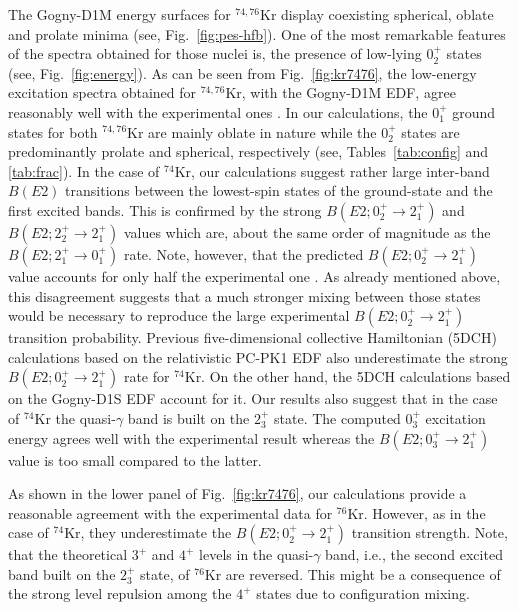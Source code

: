 \documentclass[twocolumn,showpacs,amsmath,amssymb,superscriptaddress]{revtex4-1}
\begin{document}
The Gogny-D1M  energy surfaces  for  $^{74,76}$Kr 
display coexisting spherical, oblate and prolate minima
(see, Fig.~\ref{fig:pes-hfb}). One of the most remarkable 
features of the spectra obtained for those nuclei is, the 
presence of  low-lying $0^+_2$ states
(see, Fig.~\ref{fig:energy}).  As can be seen from 
Fig.~\ref{fig:kr7476}, the low-energy excitation spectra
obtained for  $^{74,76}$Kr, with the Gogny-D1M 
EDF, agree reasonably well with the experimental ones \cite{clement2007}.
In our calculations, the  $0^+_1$ ground states for
both $^{74,76}$Kr  are mainly oblate in nature
while the $0^+_2$ states  are predominantly
prolate and spherical, respectively (see, Tables~\ref{tab:config} and \ref{tab:frac}).
In the case of $^{74}$Kr, our calculations suggest rather large inter-band $B(E2)$
transitions between the lowest-spin states of the ground-state and the
first excited bands. This is confirmed by the  strong  
$B(E2; 0^+_2\rightarrow 2^+_1)$ and $B(E2; 2^+_2\rightarrow 2^+_1)$
values which are, about the same order of magnitude as the 
$B(E2; 2^+_1\rightarrow 0^+_1)$  rate. Note, however, that
the predicted
$B(E2; 0^+_2\rightarrow 2^+_1)$ value 
accounts for only half the experimental one  \cite{clement2007}. 
As already mentioned above, this disagreement suggests that a much 
stronger mixing between those states would be necessary to reproduce the
 large experimental $B(E2; 0^+_2\rightarrow 2^+_1)$ transition probability. 
Previous five-dimensional collective Hamiltonian (5DCH) calculations 
\cite{fu2013}
based on the relativistic PC-PK1 EDF also underestimate the
strong $B(E2; 0^+_2\rightarrow 2^+_1)$ rate for $^{74}$Kr. On the other hand, the 
5DCH calculations based on the Gogny-D1S EDF 
\cite{clement2007} account for it. 
Our results also suggest that in the case of 
$^{74}$Kr the quasi-$\gamma$
band is built on the $2^+_3$ state. The computed 
$0^+_3$ excitation energy agrees well with the experimental 
result whereas the $B(E2; 0^+_3\rightarrow
2^+_1)$ value is too small compared to the latter.


As shown in the lower panel of Fig.~\ref{fig:kr7476}, our calculations
provide  a reasonable agreement with the experimental 
data for  $^{76}$Kr. However, as in the case of 
$^{74}$Kr, they underestimate the $B(E2; 0^+_2\rightarrow 2^+_1)$ transition strength. 
Note, that the theoretical $3^+$ and $4^+$ levels in the quasi-$\gamma$
band, i.e., the second excited band built on the $2^+_3$ state, of
$^{76}$Kr are reversed. This might be a consequence of the strong level
repulsion among the $4^+$ states due to configuration mixing. 
\end{document}
